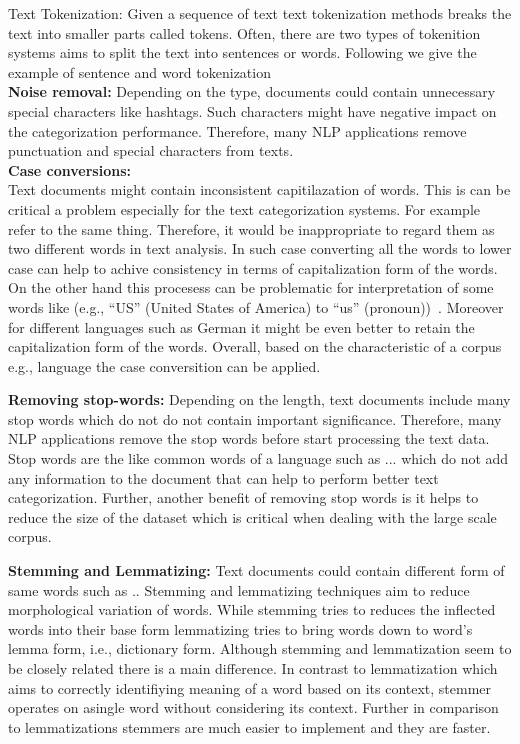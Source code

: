 Text Tokenization: Given a sequence of text text tokenization methods breaks the text into smaller parts called tokens. Often, there are two types of  tokenition systems aims to split the text into sentences or words. Following we give the example of sentence and word tokenization\\

\textbf{Noise removal:} Depending on the type, documents could contain unnecessary special characters like hashtags. Such characters might have negative impact on the categorization performance. Therefore, many NLP applications remove punctuation
and special characters from texts.\\

\textbf{Case conversions:}\\
Text documents might contain inconsistent capitilazation of words. This is can be critical a problem especially for the text categorization systems. For example refer to the same thing. Therefore, it would be inappropriate to regard them as two different words in text analysis. In such case converting all the words to lower case can help to achive consistency in terms of capitalization form of the words. On the other hand this procesess can be problematic for interpretation of some words like (e.g., “US” (United States of America) to “us” (pronoun))~\cite{text_class_survey_2019}. Moreover for different languages such as German it might be even better to retain the capitalization form of the words. Overall, based on the characteristic of a corpus e.g., language the case conversition can be applied.  

\textbf{Removing stop-words:} Depending on the length, text documents include many stop words which do not do not contain important significance. Therefore, many NLP applications remove the stop words before start processing the text data. Stop words are the like common words of a language such as ... which do not add any information to the document that can help to perform better text categorization. Further, another benefit of removing stop words is it helps to reduce the size of the dataset which is critical when dealing with the large scale corpus.

\textbf{Stemming and Lemmatizing:} Text documents could contain different form of same words such as .. Stemming and lemmatizing techniques aim to reduce morphological variation of words. While stemming tries to reduces the inflected words into their base form lemmatizing tries to bring words down to word's lemma form, i.e., dictionary form. Although stemming and lemmatization seem to be closely related there is a main difference. In contrast to lemmatization which aims to correctly identifiying meaning of a word based on its context, stemmer operates on asingle word without considering its context. Further in comparison to lemmatizations stemmers are much easier to implement and they are faster. 

